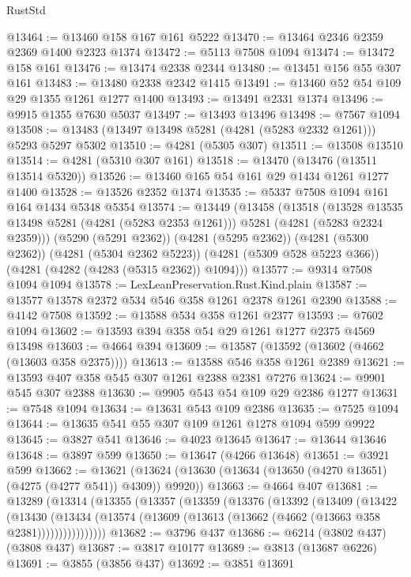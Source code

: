 \begin{lexlean}{RustStd}
\begin{coremodule}
@13464 := @13460 @158 @167 @161 @5222
@13470 := @13464 @2346 @2359 @2369 @1400 @2323 @1374
@13472 := @5113 @7508 @1094
@13474 := @13472 @158 @161
@13476 := @13474 @2338 @2344
@13480 := @13451 @156 @55 @307 @161
@13483 := @13480 @2338 @2342 @1415
@13491 := @13460 @52 @54 @109 @29 @1355 @1261 @1277 @1400
@13493 := @13491 @2331 @1374
@13496 := @9915 @1355 @7630 @5037
@13497 := @13493 @13496
@13498 := @7567 @1094
@13508 := @13483 (@13497 @13498 @5281 (@4281 (@5283 @2332 @1261))) @5293 @5297 @5302
@13510 := @4281 (@5305 @307)
@13511 := @13508 @13510
@13514 := @4281 (@5310 @307 @161)
@13518 := @13470 (@13476 (@13511 @13514 @5320))
@13526 := @13460 @165 @54 @161 @29 @1434 @1261 @1277 @1400
@13528 := @13526 @2352 @1374
@13535 := @5337 @7508 @1094 @161 @164 @1434 @5348 @5354
@13574 := @13449
    (@13458
      (@13518
        (@13528 @13535 @13498 @5281 (@4281 (@5283 @2353 @1261)))
        @5281
        (@4281 (@5283 @2324 @2359)))
      (@5290 (@5291 @2362))
      (@4281 (@5295 @2362))
      (@4281 (@5300 @2362))
      (@4281 (@5304 @2362 @5223))
      (@4281 (@5309 @528 @5223 @366))
      (@4281 (@4282 (@4283 (@5315 @2362)) @1094)))
@13577 := @9314 @7508 @1094 @1094
@13578 := LexLeanPreservation.Rust.Kind.plain
@13587 := @13577 @13578 @2372 @534 @546 @358 @1261 @2378 @1261 @2390
@13588 := @4142 @7508
@13592 := @13588 @534 @358 @1261 @2377
@13593 := @7602 @1094
@13602 := @13593 @394 @358 @54 @29 @1261 @1277 @2375 @4569 @13498
@13603 := @4664 @394
@13609 := @13587 (@13592 (@13602 (@4662 (@13603 @358 @2375))))
@13613 := @13588 @546 @358 @1261 @2389
@13621 := @13593 @407 @358 @545 @307 @1261 @2388 @2381 @7276
@13624 := @9901 @545 @307 @2388
@13630 := @9905 @543 @54 @109 @29 @2386 @1277
@13631 := @7548 @1094
@13634 := @13631 @543 @109 @2386
@13635 := @7525 @1094
@13644 := @13635 @541 @55 @307 @109 @1261 @1278 @1094 @599 @9922
@13645 := @3827 @541
@13646 := @4023 @13645
@13647 := @13644 @13646
@13648 := @3897 @599
@13650 := @13647 (@4266 @13648)
@13651 := @3921 @599
@13662 := @13621 (@13624 (@13630 (@13634 (@13650 (@4270 @13651) (@4275 (@4277 @541)) @4309)) @9920))
@13663 := @4664 @407
@13681 := @13289
    (@13314
      (@13355
        (@13357
          (@13359
            (@13376
              (@13392
                (@13409
                  (@13422
                    (@13430
                      (@13434
                        (@13574 (@13609 (@13613 (@13662 (@4662 (@13663 @358 @2381))))))))))))))))
@13682 := @3796 @437
@13686 := @6214 (@3802 @437) (@3808 @437)
@13687 := @3817 @10177
@13689 := @3813 (@13687 @6226)
@13691 := @3855 (@3856 @437)
@13692 := @3851 @13691

\end{coremodule}
\end{lexlean}
